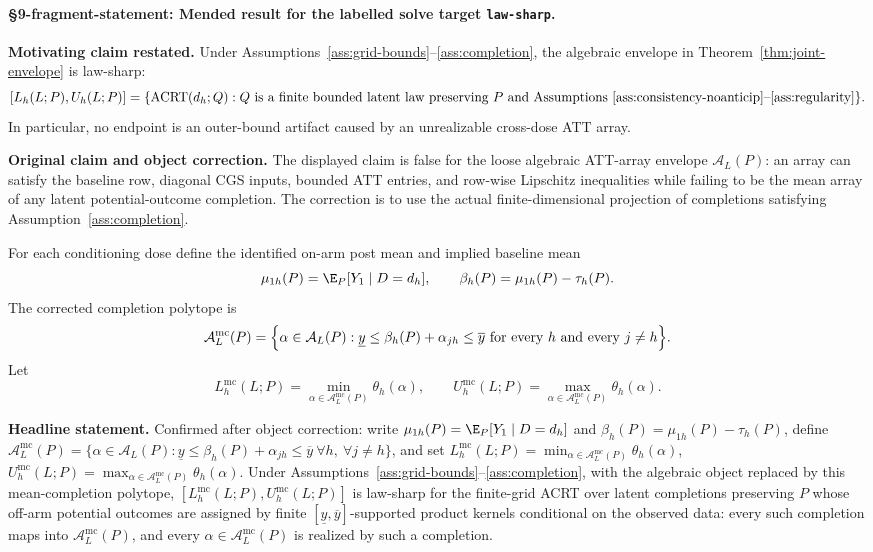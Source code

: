 \paragraph{\S9-fragment-statement: Mended result for the labelled solve target \texttt{law-sharp}.}\label{prop:law-sharp-mended}
\textbf{Motivating claim restated.} Under Assumptions~\ref{ass:grid-bounds}--\ref{ass:completion}, the algebraic
envelope in Theorem~\ref{thm:joint-envelope} is law-sharp:
\[
  [L_h(L;P),U_h(L;P)]
  =
  \{\operatorname{ACRT}(d_h;Q):Q \text{ is a finite bounded latent law
  preserving } P \text{ and Assumptions } \ref{ass:consistency-noanticip}
  \text{--}\ref{ass:regularity}\}.
\]
In particular, no endpoint is an outer-bound artifact caused by an
unrealizable cross-dose ATT array.

\textbf{Original claim and object correction.} The displayed claim is false for
the loose algebraic ATT-array envelope \(\mathcal A_L(P)\): an array can
satisfy the baseline row, diagonal CGS inputs, bounded ATT entries, and
row-wise Lipschitz inequalities while failing to be the mean array of any
latent potential-outcome completion.  The correction is to use the actual
finite-dimensional projection of completions satisfying Assumption~\ref{ass:completion}.

For each conditioning dose define the identified on-arm post mean and implied
baseline mean
\[
  \mu_{1h}(P)=\E_P[Y_1\mid D=d_h],
  \qquad
  \beta_h(P)=\mu_{1h}(P)-\tau_h(P).
\]
The corrected completion polytope is
\[
  \mathcal A_L^{\mathrm{mc}}(P)
  =
  \Bigl\{\alpha\in\mathcal A_L(P):
    \underline y\le \beta_h(P)+\alpha_{j h}\le \overline y
    \text{ for every }h\text{ and every }j\ne h
  \Bigr\}.
\]
Let
\[
  L_h^{\mathrm{mc}}(L;P)
  =
  \min_{\alpha\in\mathcal A_L^{\mathrm{mc}}(P)}\theta_h(\alpha),
  \qquad
  U_h^{\mathrm{mc}}(L;P)
  =
  \max_{\alpha\in\mathcal A_L^{\mathrm{mc}}(P)}\theta_h(\alpha).
\]

\textbf{Headline statement.} Confirmed after object correction: write \(\mu_{1h}(P)=\E_P[Y_1\mid D=d_h]\) and \(\beta_h(P)=\mu_{1h}(P)-\tau_h(P)\), define \(\mathcal A_L^{\mathrm{mc}}(P)=\{\alpha\in\mathcal A_L(P):\underline y\le \beta_h(P)+\alpha_{jh}\le\overline y\ \forall h,\ \forall j\ne h\}\), and set \(L_h^{\mathrm{mc}}(L;P)=\min_{\alpha\in\mathcal A_L^{\mathrm{mc}}(P)}\theta_h(\alpha)\), \(U_h^{\mathrm{mc}}(L;P)=\max_{\alpha\in\mathcal A_L^{\mathrm{mc}}(P)}\theta_h(\alpha)\). Under Assumptions~\ref{ass:grid-bounds}--\ref{ass:completion}, with the algebraic object replaced by this mean-completion polytope, \([L_h^{\mathrm{mc}}(L;P),U_h^{\mathrm{mc}}(L;P)]\) is law-sharp for the finite-grid ACRT over latent completions preserving \(P\) whose off-arm potential outcomes are assigned by finite \([\underline y,\overline y]\)-supported product kernels conditional on the observed data: every such completion maps into \(\mathcal A_L^{\mathrm{mc}}(P)\), and every \(\alpha\in\mathcal A_L^{\mathrm{mc}}(P)\) is realized by such a completion.

